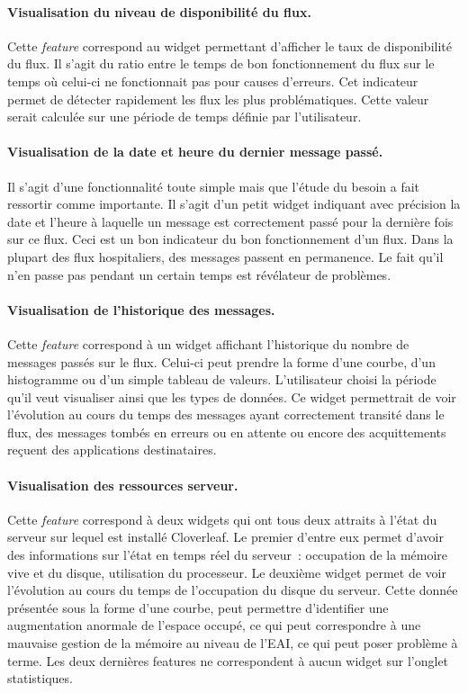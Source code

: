 			\paragraph{Visualisation du niveau de disponibilité du flux.}
			Cette \textit{feature} correspond au widget permettant d'afficher le taux de
			disponibilité du flux. Il s'agit du ratio entre le temps de bon
			fonctionnement du flux sur le temps où celui-ci ne fonctionnait pas pour
			causes d'erreurs. Cet indicateur permet de détecter rapidement les flux les
			plus problématiques. Cette valeur serait calculée sur une période de temps
			définie par l'utilisateur.
			
			\paragraph{Visualisation de la date et heure du dernier message passé.}
			Il s'agit d'une fonctionnalité toute simple mais que l'étude du besoin a fait
			ressortir comme importante. Il s'agit d'un petit widget indiquant avec
			précision la date et l'heure à laquelle un message est correctement passé
			pour la dernière fois sur ce flux. Ceci est un bon indicateur du bon
			fonctionnement d'un flux. Dans la plupart des flux hospitaliers, des messages
			passent en permanence. Le fait qu'il n'en passe pas pendant un certain temps
			est révélateur de problèmes.
			
			\paragraph{Visualisation de l’historique des messages.}
			Cette \textit{feature} correspond à un widget affichant l'historique du
			nombre de messages passés sur le flux. Celui-ci peut prendre la forme d'une courbe,
			d'un histogramme ou d'un simple tableau de valeurs. L'utilisateur choisi la
			période qu'il veut visualiser ainsi que les types de données. Ce widget
			permettrait de voir l'évolution au cours du temps des messages ayant
			correctement transité dans le flux, des messages tombés en erreurs ou en
			attente ou encore des acquittements reçuent des applications destinataires.
			
			\paragraph{Visualisation des ressources serveur.}
			Cette \textit{feature} correspond à deux widgets qui ont tous deux attraits à
			l'état du serveur sur lequel est installé Cloverleaf. Le premier d'entre eux permet
			d'avoir des informations sur l'état en temps réel du serveur~: occupation de
			la mémoire vive et du disque, utilisation du processeur. Le deuxième widget
			permet de voir l'évolution au cours du temps de l'occupation du disque du
			serveur. Cette donnée présentée sous la forme d'une courbe, peut permettre
			d'identifier une augmentation anormale de l'espace occupé, ce qui peut
			correspondre à une mauvaise gestion de la mémoire au niveau de l'EAI, ce qui
			peut poser problème à terme.\newline
			Les deux dernières features ne correspondent à aucun widget sur l'onglet
			statistiques.
			
